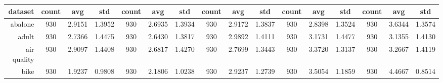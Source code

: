 \begin{table}[H]
{\begin{tabular}{rccccccccccccccc}
			\cmidrule{2-16}    \textbf{dataset} & \textbf{count}                       & \textbf{avg}                                                                       & \textbf{std}    & \textbf{count} & \textbf{avg}                                                              & \textbf{std}    & \textbf{count} & \textbf{avg}                                                              & \textbf{std}    & \textbf{count} & \textbf{avg}                                                              & \textbf{std}    & \textbf{count} & \textbf{avg}    & \textbf{std}    \\
			\midrule
			abalone                             & 930                                  & 2.9151                                                                             & 1.3952          & 930            & \cellcolor[rgb]{ .776,  .937,  .808}\textcolor[rgb]{ 0,  .38,  0}{2.6935} & 1.3934          & 930            & 2.9172                                                                    & 1.3837          & 930            & 2.8398                                                                    & 1.3524          & 930            & 3.6344          & 1.3574          \\
			adult                               & 930                                  & 2.7366                                                                             & 1.4475          & 930            & 2.6430                                                                    & 1.3817          & 930            & 2.9892                                                                    & 1.4111          & 930            & 3.1731                                                                    & 1.4477          & 930            & 3.1355          & 1.4130          \\
			air quality                         & 930                                  & 2.9097                                                                             & 1.4408          & 930            & \cellcolor[rgb]{ .776,  .937,  .808}\textcolor[rgb]{ 0,  .38,  0}{2.6817} & 1.4270          & 930            & 2.7699                                                                    & 1.3443          & 930            & 3.3720                                                                    & 1.3137          & 930            & 3.2667          & 1.4119          \\
			bike                                & 930                                  & 1.9237                                                                             & 0.9808          & 930            & 2.1806                                                                    & 1.0238          & 930            & 2.9237                                                                    & 1.2739          & 930            & 3.5054                                                                    & 1.1859          & 930            & 4.4667          & 0.8514          \\

\end{tabular}}
\end{table}
